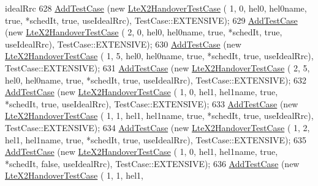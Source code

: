 \begin{DoxyCode}
{       idealRrc}
628           \hyperlink{classns3_1_1TestCase_a3718088e3eefd5d6454569d2e0ddd835}{AddTestCase} (\textcolor{keyword}{new} \hyperlink{classLteX2HandoverTestCase}{LteX2HandoverTestCase} (  1,    0,    hel0, 
      hel0name, \textcolor{keyword}{true}, *schedIt, \textcolor{keyword}{true},  useIdealRrc), TestCase::EXTENSIVE);
629           \hyperlink{classns3_1_1TestCase_a3718088e3eefd5d6454569d2e0ddd835}{AddTestCase} (\textcolor{keyword}{new} \hyperlink{classLteX2HandoverTestCase}{LteX2HandoverTestCase} (  2,    0,    hel0, 
      hel0name, \textcolor{keyword}{true}, *schedIt, \textcolor{keyword}{true},  useIdealRrc), TestCase::EXTENSIVE);
630           \hyperlink{classns3_1_1TestCase_a3718088e3eefd5d6454569d2e0ddd835}{AddTestCase} (\textcolor{keyword}{new} \hyperlink{classLteX2HandoverTestCase}{LteX2HandoverTestCase} (  1,    5,    hel0, 
      hel0name, \textcolor{keyword}{true}, *schedIt, \textcolor{keyword}{true},  useIdealRrc), TestCase::EXTENSIVE);
631           \hyperlink{classns3_1_1TestCase_a3718088e3eefd5d6454569d2e0ddd835}{AddTestCase} (\textcolor{keyword}{new} \hyperlink{classLteX2HandoverTestCase}{LteX2HandoverTestCase} (  2,    5,    hel0, 
      hel0name, \textcolor{keyword}{true}, *schedIt, \textcolor{keyword}{true},  useIdealRrc), TestCase::EXTENSIVE);
632           \hyperlink{classns3_1_1TestCase_a3718088e3eefd5d6454569d2e0ddd835}{AddTestCase} (\textcolor{keyword}{new} \hyperlink{classLteX2HandoverTestCase}{LteX2HandoverTestCase} (  1,    0,    hel1, 
      hel1name, \textcolor{keyword}{true}, *schedIt, \textcolor{keyword}{true},  useIdealRrc), TestCase::EXTENSIVE);
633           \hyperlink{classns3_1_1TestCase_a3718088e3eefd5d6454569d2e0ddd835}{AddTestCase} (\textcolor{keyword}{new} \hyperlink{classLteX2HandoverTestCase}{LteX2HandoverTestCase} (  1,    1,    hel1, 
      hel1name, \textcolor{keyword}{true}, *schedIt, \textcolor{keyword}{true},  useIdealRrc), TestCase::EXTENSIVE);
634           \hyperlink{classns3_1_1TestCase_a3718088e3eefd5d6454569d2e0ddd835}{AddTestCase} (\textcolor{keyword}{new} \hyperlink{classLteX2HandoverTestCase}{LteX2HandoverTestCase} (  1,    2,    hel1, 
      hel1name, \textcolor{keyword}{true}, *schedIt, \textcolor{keyword}{true},  useIdealRrc), TestCase::EXTENSIVE);
635           \hyperlink{classns3_1_1TestCase_a3718088e3eefd5d6454569d2e0ddd835}{AddTestCase} (\textcolor{keyword}{new} \hyperlink{classLteX2HandoverTestCase}{LteX2HandoverTestCase} (  1,    0,    hel1, 
      hel1name, \textcolor{keyword}{true}, *schedIt, \textcolor{keyword}{false}, useIdealRrc), TestCase::EXTENSIVE);
636           \hyperlink{classns3_1_1TestCase_a3718088e3eefd5d6454569d2e0ddd835}{AddTestCase} (\textcolor{keyword}{new} \hyperlink{classLteX2HandoverTestCase}{LteX2HandoverTestCase} (  1,    1,    hel1, 

\end{DoxyCode}
